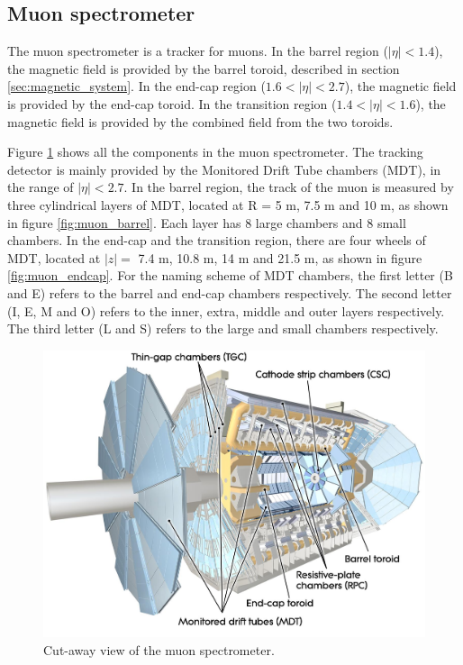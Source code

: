 \subsection{Muon spectrometer}
The muon spectrometer is a tracker for muons.
In the barrel region ($|\eta| < 1.4$), the magnetic field is provided by the barrel toroid, described in section \ref{sec:magnetic_system}.
In the end-cap region ($1.6 < |\eta| < 2.7$), the magnetic field is provided by the end-cap toroid.
In the transition region ($1.4 < |\eta| < 1.6$), the magnetic field is provided by the combined field from the two toroids.

Figure \ref{fig:muon_spectrometer} shows all the components in the muon spectrometer.
The tracking detector is mainly provided by the Monitored Drift Tube chambers (MDT), in the range of $|\eta| < 2.7$.
In the barrel region, the track of the muon is measured by three cylindrical layers of MDT, located at R = 5 m, 7.5 m and 10 m, as shown in figure \ref{fig:muon_barrel}.
Each layer has 8 large chambers and 8 small chambers.
In the end-cap and the transition region, there are four wheels of MDT, located at $|z|=$ 7.4 m, 10.8 m, 14 m and 21.5 m, as shown in figure \ref{fig:muon_endcap}.
For the naming scheme of MDT chambers, the first letter (B and E) refers to the barrel and end-cap chambers respectively.
The second letter (I, E, M and O) refers to the inner, extra, middle and outer layers respectively.
The third letter (L and S) refers to the large and small chambers respectively.

\begin{figure}
\centering
\includegraphics[width=\textwidth]{data/photo/detector/muon_spectrometer.jpg}
\caption{Cut-away view of the muon spectrometer. \cite{muon_spectrometer}}
\label{fig:muon_spectrometer}
\end{figure}

